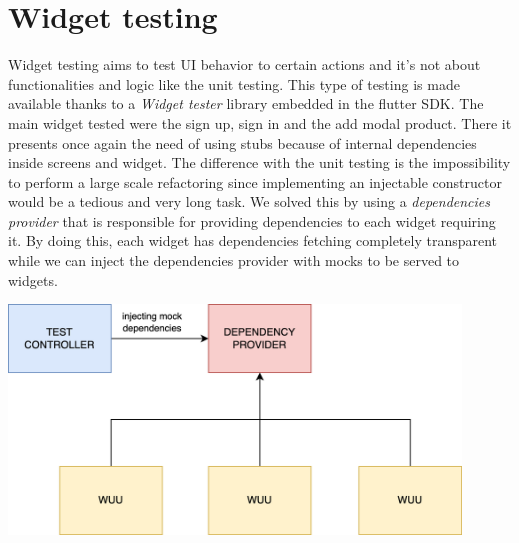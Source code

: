 \section{Widget testing}
Widget testing aims to test UI behavior to certain actions and it's not about functionalities and logic like the unit testing.
This type of testing is made available thanks to a \textit{Widget tester} library embedded in the flutter SDK.
\newline
\newline
\noindent The main widget tested were the sign up, sign in and the add modal product.
\newline
\newline
\noindent There it presents once again the need of using stubs because of internal dependencies inside screens and widget. The difference with the unit testing is the impossibility to perform a large scale refactoring since implementing an injectable constructor would be a tedious and very long task. We solved this by using a \textit{dependencies provider} that is responsible for providing dependencies to each widget requiring it. By doing this, each widget has dependencies fetching completely transparent while we can inject the dependencies provider with mocks to be served to widgets.

\begin{center}
    \vspace{1cm}\includegraphics[width=12cm,keepaspectratio]{Images/testing/widget_testing.png}
\end{center}


\newpage